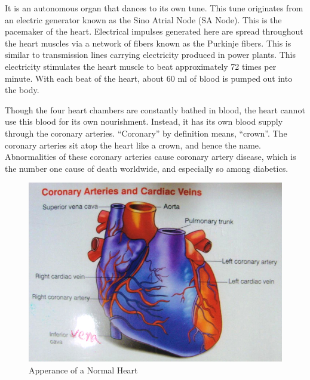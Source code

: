 It is an autonomous organ that dances to its own tune. This tune originates from an electric generator known as the Sino Atrial Node (SA Node). This is the pacemaker of the heart. Electrical impulses generated here are spread throughout the heart muscles via a network of fibers known as the Purkinje fibers. This is similar to transmission lines carrying electricity produced in power plants. This electricity stimulates the heart muscle to beat approximately 72 times per minute. With each beat of the heart, about 60 ml of blood is pumped out into the body.

Though the four heart chambers are constantly bathed in blood, the heart cannot use this blood for its own nourishment. Instead, it has its own blood supply through the coronary arteries. “Coronary” by definition means, “crown”. The coronary arteries sit atop the heart like a crown, and hence the name. Abnormalities of these coronary arteries cause coronary artery disease, which is the number one cause of death worldwide, and especially so among diabetics.

\begin{figure}
\includegraphics{images/039.jpg}
\caption{Apperance of a Normal Heart}
\end{figure}


